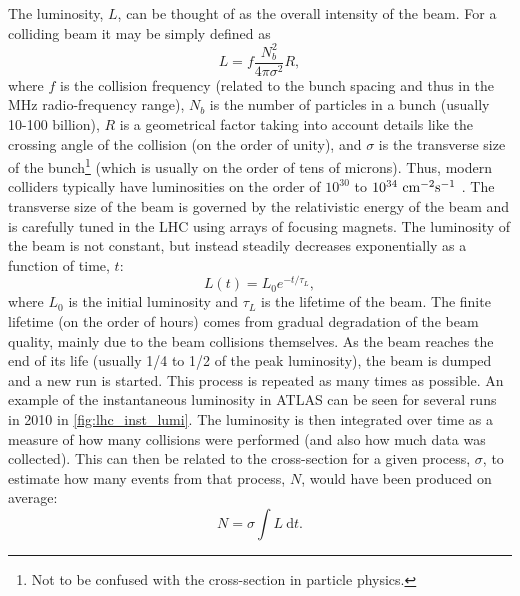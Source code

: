 The luminosity, $L$,  can be thought of as the overall intensity of the beam.
For a colliding beam it may be simply defined as
\begin{equation}
L=f \frac{N_b^2}{4\pi\sigma^2} R,
\end{equation}
where $f$ is the collision frequency (related to the bunch spacing and thus
in the MHz radio-frequency range), 
$N_b$ is the number of particles in a bunch (usually 10-100 billion), 
$R$ is a  geometrical factor
taking into account details like the crossing angle of the collision (on the
order of unity),
and $\sigma$ is the transverse size of the bunch\footnote{Not to be confused
with the cross-section in particle physics.} (which 
is usually on the order of tens of microns).
Thus, modern colliders typically have luminosities on the order of 
$10^{30}$ to $10^{34}~\textrm{cm}^{-2}\textrm{s}^{-1}$ \cite{PDG:2014}.
The transverse size of the beam is governed by the relativistic 
energy of the beam and is carefully tuned in the LHC
using arrays of focusing magnets. 
The luminosity of the beam is not constant, but instead steadily decreases
exponentially as a function of time, $t$:
\begin{equation}
L(t) = L_0 e^{-t/\tau_L} ,
\label{eq:lhc_lumi}
\end{equation}
where $L_0$ is the initial luminosity and $\tau_L$ is the lifetime of the 
beam. The finite lifetime (on the order of hours) comes from gradual 
degradation of the beam quality, mainly due to the beam collisions themselves.
As the beam reaches the end of its 
life (usually 1/4 to 1/2 of the peak luminosity), the beam is dumped and a new
run is started. This process is repeated as many times as possible. 
An example of the instantaneous luminosity in ATLAS can be seen for
several runs in 2010 in \fig\ref{fig:lhc_inst_lumi}.
The luminosity is then integrated over time as a measure of how many collisions
were performed (and also how much data was collected).  This can
then be related to the cross-section for a given process, $\sigma$, to estimate
how many events from that process, $N$, would have been produced on average:
\begin{equation}
N=\sigma \int L~ \textrm{d}t .
\label{eq:lhc_nevents}
\end{equation}

